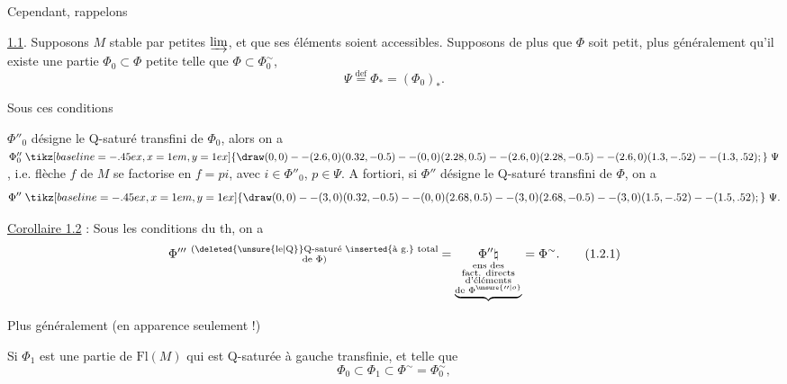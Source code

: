 Cependant, rappelons

\uline{ 1.1}.
Supposons $M$ stable par petites $\varinjlim$, et que ses éléments
soient accessibles. Supposons de plus que $\Phi$ soit petit, plus
généralement qu'il existe une partie $\Phi_0\subset\Phi$ petite telle
que $\Phi\subset\Phi_0^{\sim}$, 
\[
 \Psi\overset{\mathrm{def}}{=}\Phi_*=(\Phi_0)_* .\tag*{(1.1.1)}
\]

Sous ces conditions

$\Phi''_0$ désigne le Q-saturé  transfini
 de $\Phi_0$, alors on a
$\Phi''_0 \mathrel{\tikz[baseline=-.45ex,x=1em,y=1ex]{\draw (0,0)--(2.6,0) (0.32,-0.5)--(0,0) (2.28,0.5)--(2.6,0) (2.28,-0.5)--(2.6,0) (1.3,-.52)--(1.3,.52);}} \Psi$, i.e.  flèche $f$ de $M$ se
factorise en $f=pi$, avec $i\in\Phi''_0$, $p\in\Psi$.
A fortiori, si $\Phi''$ désigne le Q-saturé   transfini de $\Phi$, on a \deleted{$\unsure{\Phi}$}
\[
 \Phi'' \mathrel{\tikz[baseline=-.45ex,x=1em,y=1ex]{\draw (0,0)--(3,0) (0.32,-0.5)--(0,0) (2.68,0.5)--(3,0) (2.68,-0.5)--(3,0) (1.5,-.52)--(1.5,.52);}} \Psi .
\]

\uline{Corollaire 1.2} : Sous les conditions
du th, on a
\[
 \Phi'''\ \substack{\text{(\deleted{\unsure{le|Q}}Q-saturé \inserted{à g.} total}\\
                      \text{de }\Phi\text{)}}
 =\underset{\underbrace{\substack{\text{ens des}\\\text{fact. directs}\\
             \text{d'éléments}\\\text{de }\Phi^{\unsure{\prime\prime|o}}}}}
          {\Phi''\natural}
 =\Phi^{\sim} .\tag*{(1.2.1)}
\]

Plus généralement (en apparence seulement !)

Si $\Phi_1$ est une partie de $\mathrm{Fl}(M)$ qui est Q-saturée à
gauche transfinie, et telle que
\[
 \Phi_0\subset\Phi_1\subset\Phi^{\sim}=\Phi_0^{\sim},
\]
